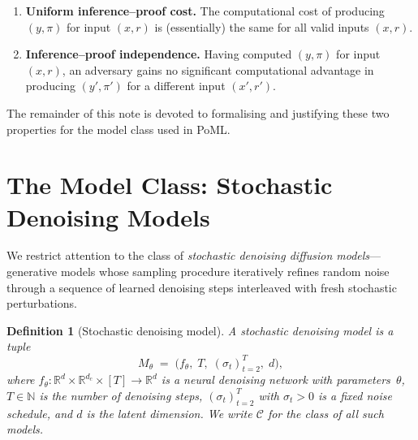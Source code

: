 \documentclass[11pt]{article}
\newtheorem{definition}{Definition}[section]
\newcommand{\calC}{\mathcal{C}}
\begin{document}
\begin{enumerate}[label=(\roman*$'$)]
    \item \textbf{Uniform inference--proof cost.} The computational cost of producing $(y, \pi)$ for input $(x, r)$ is (essentially) the same for all valid inputs $(x, r)$.
    \item \textbf{Inference--proof independence.} Having computed $(y, \pi)$ for input $(x, r)$, an adversary gains no significant computational advantage in producing $(y', \pi')$ for a different input $(x', r')$.
\end{enumerate}

The remainder of this note is devoted to formalising and justifying these two properties for the model class used in PoML.


\section{The Model Class: Stochastic Denoising Models}
\label{sec:model-class}

We restrict attention to the class of \emph{stochastic denoising diffusion models}---generative models whose sampling procedure iteratively refines random noise through a sequence of learned denoising steps interleaved with fresh stochastic perturbations.

\begin{definition}[Stochastic denoising model]
\label{def:model}
A \emph{stochastic denoising model} is a tuple
\[
    M_\theta \;=\; \bigl(f_\theta,\; T,\; (\sigma_t)_{t=2}^{T},\; d\bigr),
\]
where $f_\theta : \mathbb{R}^d \times \mathbb{R}^{d_c} \times [T] \to \mathbb{R}^d$ is a neural denoising network with parameters~$\theta$, $T \in \mathbb{N}$ is the number of denoising steps, $(\sigma_t)_{t=2}^{T}$ with $\sigma_t > 0$ is a fixed noise schedule, and $d$ is the latent dimension. We write $\calC$ for the class of all such models.
\end{definition}
\end{document}
